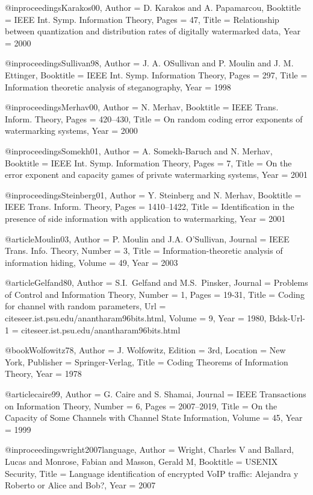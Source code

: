 {{{{{	@inproceedings{Karakos00,
	Author = {D. Karakos and A. Papamarcou},
	Booktitle = {IEEE Int. Symp. Information Theory},
	Pages = {47},
	Title = {Relationship between quantization and distribution rates of digitally watermarked data},
	Year = {2000}}
	
	@inproceedings{Sullivan98,
	Author = {J. A. OSullivan and P. Moulin and J. M. Ettinger},
	Booktitle = {IEEE Int. Symp. Information Theory},
	Pages = {297},
	Title = {Information theoretic analysis of steganography},
	Year = {1998}}
	
	@inproceedings{Merhav00,
	Author = {N. Merhav},
	Booktitle = {IEEE Trans. Inform. Theory},
	Pages = {420--430},
	Title = {On random coding error exponents of watermarking systems},
	Year = {2000}}
	
	@inproceedings{Somekh01,
	Author = {A. Somekh-Baruch and N. Merhav},
	Booktitle = {IEEE Int. Symp. Information Theory},
	Pages = {7},
	Title = {On the error exponent and capacity games of private watermarking systems},
	Year = {2001}}
	
	@inproceedings{Steinberg01,
	Author = {Y. Steinberg and N. Merhav},
	Booktitle = {IEEE Trans. Inform. Theory},
	Pages = {1410--1422},
	Title = {Identification in the presence of side information with application to watermarking},
	Year = {2001}}
	
	@article{Moulin03,
	Author = {P. Moulin and J.A. O'Sullivan},
	Journal = {IEEE Trans. Info. Theory},
	Number = {3},
	Title = {Information-theoretic analysis of information hiding},
	Volume = 49,
	Year = 2003}
	
	@article{Gelfand80,
	Author = {S.I.~Gelfand and M.S.~Pinsker},
	Journal = {Problems of Control and Information Theory},
	Number = {1},
	Pages = {19-31},
	Title = {{Coding for channel with random parameters}},
	Url = {citeseer.ist.psu.edu/anantharam96bits.html},
	Volume = {9},
	Year = {1980},
	Bdsk-Url-1 = {citeseer.ist.psu.edu/anantharam96bits.html}}
	
	@book{Wolfowitz78,
	Author = {J. Wolfowitz},
	Edition = {3rd},
	Location = {New York},
	Publisher = {Springer-Verlag},
	Title = {Coding Theorems of Information Theory},
	Year = 1978}
	
	@article{caire99,
	Author = {G. Caire and S. Shamai},
	Journal = {IEEE Transactions on Information Theory},
	Number = {6},
	Pages = {2007--2019},
	Title = {On the Capacity of Some Channels with Channel State Information},
	Volume = {45},
	Year = {1999}}
	
	@inproceedings{wright2007language,
	Author = {Wright, Charles V and Ballard, Lucas and Monrose, Fabian and Masson, Gerald M},
	Booktitle = {USENIX Security},
	Title = {{Language identification of encrypted VoIP traffic: Alejandra y Roberto or Alice and Bob?}},
	Year = {2007}}
	
}}}}}
